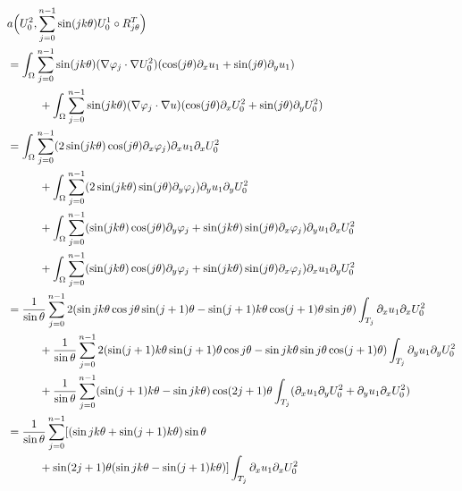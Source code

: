 \documentclass[JEP,XML,SOM,Unicode,ThmDefs,NoFloatCountersInSection,published]{cedram}
\theoremstyle{plain}
\theoremstyle{definition}
\begin{document}
\vspace*{-1\baselineskip}
\bgroup\smaller
\begin{align*}
&a\Bigl(U_0^2,\sum_{j=0}^{n-1} \sin(jk\theta) U_0^1 \circ R_{j\theta}^T\Bigr)\\
&= \int_\Omega \sum_{j=0}^{n-1} \sin(jk\theta)(\nabla \varphi_j\cdot \nabla U_0^2)(\cos(j\theta) \partial_x u_1+\sin (j\theta)\partial_y u_1) \\
&\hspace*{1cm}+ \int_\Omega \sum_{j=0}^{n-1}\sin(jk\theta) (\nabla \varphi_j\cdot \nabla u)(\cos(j\theta) \partial_x U_0^2 +\sin(j\theta) \partial_y U_0^2) \\
&= \int_\Omega \sum_{j=0}^{n-1} (2 \sin(jk\theta)\cos(j\theta)\partial_x \varphi_j) \partial_x u_1 \partial_x U_0^2 \\
&\hspace*{1cm}+ \int_\Omega \sum_{j=0}^{n-1}(2\sin(jk\theta)\sin(j\theta)\partial_y \varphi_j) \partial_y u_1 \partial_y U_0^2 \\
&\hspace*{1cm}+ \int_\Omega \sum_{j=0}^{n-1} (\sin(jk\theta)\cos(j\theta)\partial_y \varphi_j+\sin(jk\theta)\sin(j\theta)\partial_x \varphi_j) \partial_y u_1 \partial_x U_0^2 \\
&\hspace*{1cm}+ \int_\Omega \sum_{j=0}^{n-1} (\sin(jk\theta)\cos(j\theta)\partial_y \varphi_j+\sin(jk\theta)\sin(j\theta)\partial_x \varphi_j) \partial_x u_1 \partial_y U_0^2\\
&=\frac{1}{\sin \theta}\sum_{j=0}^{n-1}2 (\sin jk\theta \cos j \theta \sin(j+1)\theta -\sin(j+1)k\theta \cos (j+1)\theta \sin j\theta) \int_{T_j} \partial_x u_1 \partial_x U_0^2\\
&\hspace*{1cm}+\frac{1}{\sin \theta}\sum_{j=0}^{n-1} 2(\sin(j+1)k\theta \sin(j+1)\theta \cos j \theta-\sin jk\theta \sin j \theta \cos(j+1)\theta)\int_{T_j} \partial_y u_1 \partial_y U_0^2\\
&\hspace*{1cm}+\frac{1}{\sin \theta}\sum_{j=0}^{n-1} (\sin(j+1)k\theta-\sin jk\theta)\cos(2j+1)\theta
\int_{T_j} (\partial_x u_1 \partial_y U_0^2 + \partial_y u_1 \partial_x U_0^2)\\
&=\frac{1}{\sin \theta}\sum_{j=0}^{n-1}[ (\sin jk\theta + \sin(j+1)k\theta)\sin \theta\\
&\hspace*{1cm}+ \sin (2j+1)\theta (\sin jk\theta -\sin(j+1)k\theta) ]\int_{T_j} \partial_x u_1 \partial_x U_0^2\\

\end{align*}
\end{document}
